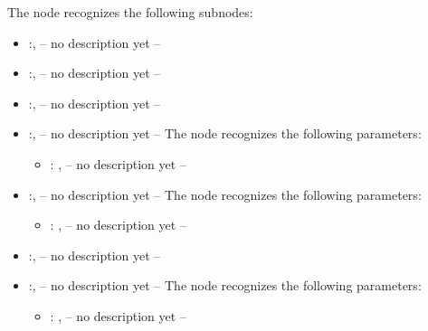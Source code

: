 \begin{itemize}
\begin{itemize}
\begin{itemize}
              The  node recognizes the following subnodes:
              \begin{itemize}
                \item {}:, 
                  -- no description yet --

                \item {}:, 
                  -- no description yet --

                \item {}:, 
                  -- no description yet --

                \item {}:, 
                  -- no description yet --
                  The  node recognizes the following parameters:
                    \begin{itemize}
                      \item {}: , 
                        -- no description yet --
                  \end{itemize}

                \item {}:, 
                  -- no description yet --
                  The  node recognizes the following parameters:
                    \begin{itemize}
                      \item {}: , 
                        -- no description yet --
                  \end{itemize}

                \item {}:, 
                  -- no description yet --

                \item {}:, 
                  -- no description yet --
                  The  node recognizes the following parameters:
                    \begin{itemize}
                      \item {}: , 
                        -- no description yet --
                  \end{itemize}
              \end{itemize}


\end{itemize}
\end{itemize}
\end{itemize}
